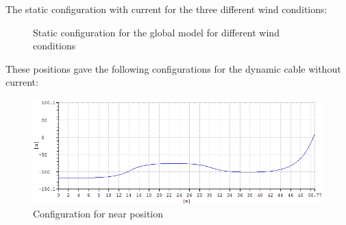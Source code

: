 The static configuration with current for the three different wind conditions: 
\begin{figure}[H]
\hfill
{}\hfill
  \hfill
\caption{Static configuration for the global model for different wind conditions}
\label{fig:statcon}
\end{figure}

\noindent These positions gave the following configurations for the dynamic cable without current: 
\begin{figure}[H]
\centering
\includegraphics[scale=0.5]{figures/confignear}
\caption{Configuration for near position}
 \label{fig:confignear}
\end{figure}

